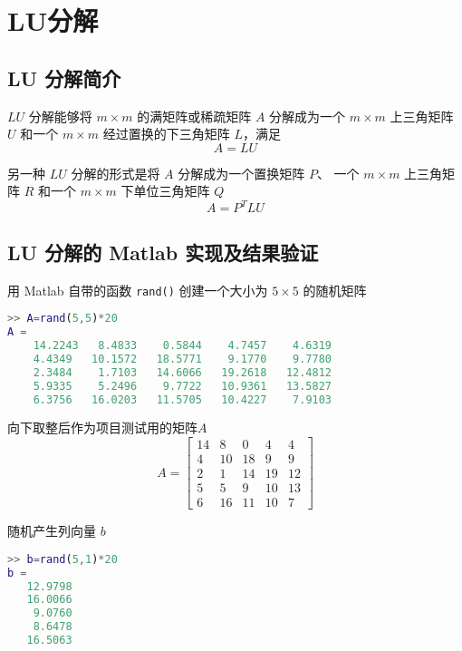 \chapter{LU分解}
\section{LU 分解简介}
$LU$ 分解能够将 $m\times m$ 的满矩阵或稀疏矩阵 $A$ 分解成为一个 $m\times m$ 上三角矩阵 $U$ 和一个 $m\times m$ 经过置换的下三角矩阵 $L$，满足
\begin{equation}
    A = LU
    \label{LU-decomposition}
\end{equation}

另一种 $LU$ 分解的形式是将 $A$ 分解成为一个置换矩阵 $P$、 一个 $m\times m$ 上三角矩阵 $R$ 和一个 $m\times m$ 下单位三角矩阵 $Q$
\begin{equation}
    A = P^TLU
    \label{QRP-decomposition}
\end{equation}

\section{LU 分解的 Matlab 实现及结果验证}
用 Matlab 自带的函数 \lstinline|rand()| 创建一个大小为 $5\times 5$ 的随机矩阵


\begin{lstlisting}[language=Matlab]  
>> A=rand(5,5)*20
A =
    14.2243   8.4833    0.5844    4.7457    4.6319
    4.4349   10.1572   18.5771    9.1770    9.7780
    2.3484    1.7103   14.6066   19.2618   12.4812
    5.9335    5.2496    9.7722   10.9361   13.5827
    6.3756   16.0203   11.5705   10.4227    7.9103
\end{lstlisting}


向下取整后作为项目测试用的矩阵$A$
\begin{equation}
    A=\begin{bmatrix}
        14 & 8  & 0  & 4  & 4  \\
        4  & 10 & 18 & 9  & 9  \\
        2  & 1  & 14 & 19 & 12 \\
        5  & 5  & 9  & 10 & 13 \\
        6  & 16 & 11 & 10 & 7
    \end{bmatrix}
\end{equation}

随机产生列向量 $b$
\begin{lstlisting}[language=Matlab]  
>> b=rand(5,1)*20
b =
   12.9798
   16.0066
    9.0760
    8.6478
   16.5063
\end{lstlisting}

